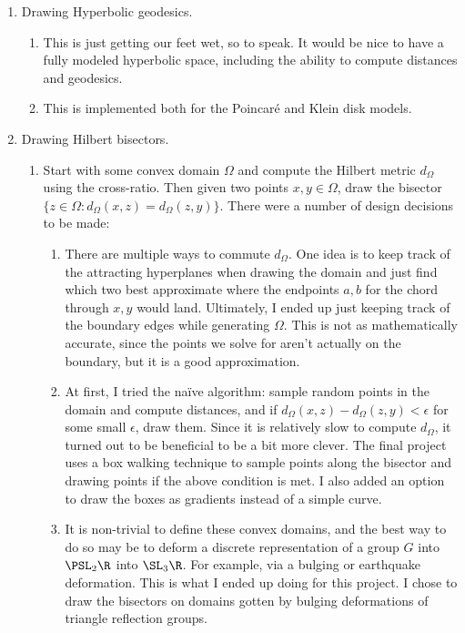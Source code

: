 \documentclass[12pt]{article}%
\begin{document}
\begin{enumerate}
	\item Drawing Hyperbolic geodesics.
	\begin{enumerate}
		\item This is just getting our feet wet, so to speak. It would be nice to have a fully modeled hyperbolic space, including the ability to compute distances and geodesics.
		\item This is implemented both for the Poincar\'e and Klein disk models.
	\end{enumerate}
	\item Drawing Hilbert bisectors.
	\begin{enumerate}
		\item Start with some convex domain $\Omega$ and compute the Hilbert metric $d_\Omega$ using the cross-ratio. Then given two points $x,y \in \Omega$, draw the bisector $\{z \in \Omega : d_\Omega(x,z) = d_\Omega(z,y)\}$. There were a number of design decisions to be made:
		\begin{enumerate}
			\item There are multiple ways to commute $d_\Omega$. One idea is to keep track of the attracting hyperplanes when drawing the domain and just find which two best approximate where the endpoints $a,b$ for the chord through $x,y$ would land. Ultimately, I ended up just keeping track of the boundary edges while generating $\Omega$. This is not as mathematically accurate, since the points we solve for aren't actually on the boundary, but it is a good approximation.
			\item At first, I tried the na\"ive algorithm: sample random points in the domain and compute distances, and if $d_\Omega(x,z) - d_\Omega(z,y) < \epsilon$ for some small $\epsilon$, draw them. Since it is relatively slow to compute $d_\Omega$, it turned out to be beneficial to be a bit more clever. The final project uses a box walking technique to sample points along the bisector and drawing points if the above condition is met. I also added an option to draw the boxes as gradients instead of a simple curve.
			\item It is non-trivial to define these convex domains, and the best way to do so may be to deform a discrete representation of a group $G$ into $\PSL_2\R$ into $\SL_3\R$. For example, via a bulging or earthquake deformation. This is what I ended up doing for this project. I chose to draw the bisectors on domains gotten by bulging deformations of triangle reflection groups.


\end{enumerate}
\end{enumerate}
\end{enumerate}
\end{document}
